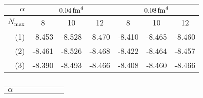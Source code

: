 \begin{table}[H]
\begin{subtable}{\textwidth}
  \end{subtable}
  \par\bigskip
  \begin{subtable}{\textwidth}
    \caption{}
    \centering
    \begin{tabular}{
        r|
        S[table-format=-2.3(3)]
        S[table-format=-2.3(3)]
        S[table-format=-2.3(3)]
        S[table-format=-2.3(3)]
        S[table-format=-2.3(3)]
        S[table-format=-2.3(3)]
      }
      \toprule
      $\alpha$                         &
       &
         \\
      \midrule
      $N_\mathrm{max}$                 &
      {8}                              &
      {10}                             &
      {12}                             &
      {8}                              &
      {10}                             &
      {12}                               \\
      \midrule
      (1)                              &
      -8.453                  &
      -8.528                  &
      -8.470                  &
      -8.410                  &
      -8.465                  &
      -8.460                    \\
      (2)                              &
      -8.461                  &
      -8.526                  &
      -8.468                  &
      -8.422                  &
      -8.464                  &
      -8.457                    \\
      (3)                              &
      -8.390                  &
      -8.493                  &
      -8.466                  &
      -8.408                  &
      -8.460                  &
      -8.466                    \\
      \bottomrule
    \end{tabular}
  \end{subtable}
  \par\bigskip
  \begin{subtable}{\textwidth}
    \caption{}
    \centering
    \begin{tabular}{
        r|
        S[table-format=-2.3(3)]
        S[table-format=-2.3(3)]
        S[table-format=-2.3(3)]
        S[table-format=-2.3(3)]
        S[table-format=-2.3(3)]
        S[table-format=-2.3(3)]
      }
      \toprule
      $\alpha$                         &

\end{tabular}
\end{subtable}
\end{table}
